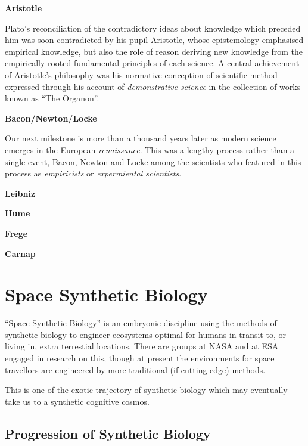 \documentclass[14pt,titlepage]{extarticle}
\begin{document}
\begin{description}
  \item{\bf Aristotle}

    Plato's reconciliation of the contradictory ideas about knowledge which preceded him was soon contradicted by his pupil Aristotle, whose epistemology emphasised empirical knowledge, but also the role of reason deriving new knowledge from the empirically rooted fundamental principles of each science.
    A central achievement of Aristotle's philosophy was his normative conception of scientific method expressed through his account of \emph{demonstrative science} in the collection of works known as ``The Organon''.
    
  \item{\bf Bacon/Newton/Locke}

    Our next milestone is more than a thousand years later as modern science emerges in the European \emph{renaissance}.
    This was a lengthy process rather than a single event, Bacon, Newton and Locke among the scientists who featured in this process as \emph{empiricists} or \emph{expermiental scientists}.
    
    
  \item{\bf Leibniz}
  \item{\bf Hume}
  \item{\bf Frege}
  \item{\bf Carnap}
  \end{description}

\section{Space Synthetic Biology}

``Space Synthetic Biology'' is an embryonic discipline using the methods of synthetic biology to engineer ecosystems optimal for humans in transit to, or living in, extra terrestial locations.
There are groups at NASA and at ESA engaged in research on this, though at present the environments for space travellors are engineered by more traditional (if cutting edge) methods.

This is one of the exotic trajectory of synthetic biology which may eventually take us to a synthetic cognitive cosmos.

\subsection{Progression of Synthetic Biology}
\end{document}
